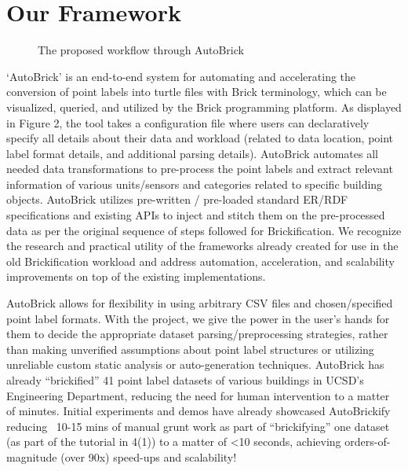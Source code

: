 \documentclass[twocolumn, switch]{article} %
\begin{document}
\section{Our Framework}

\begin{figure}[H]
  \centering
  \caption{The proposed workflow through AutoBrick}
  \label{fig:fig2}
\end{figure}

‘AutoBrick’ is an end-to-end system for automating and accelerating the conversion of point labels into turtle files with Brick terminology, which can be visualized, queried, and utilized by the Brick programming platform. As displayed in Figure 2, the tool takes a configuration file where users can declaratively specify all details about their data and workload (related to data location, point label format details, and additional parsing details). AutoBrick automates all needed data transformations to pre-process the point labels and extract relevant information of various units/sensors and categories related to specific building objects. AutoBrick utilizes pre-written / pre-loaded standard ER/RDF specifications and existing APIs to inject and stitch them on the pre-processed data as per the original sequence of steps followed for Brickification. We recognize the research and practical utility of the frameworks already created for use in the old Brickification workload and address automation, acceleration, and scalability improvements on top of the existing implementations. 

	AutoBrick allows for flexibility in using arbitrary CSV files and chosen/specified point label formats. With the project, we give the power in the user’s hands for them to decide the appropriate dataset parsing/preprocessing strategies, rather than making unverified assumptions about point label structures or utilizing unreliable custom static analysis or auto-generation techniques. AutoBrick has already “brickified” 41 point label datasets of various buildings in UCSD’s Engineering Department, reducing the need for human intervention to a matter of minutes. Initial experiments and demos have already showcased AutoBrickify reducing ~10-15 mins of manual grunt work as part of “brickifying” one dataset (as part of the tutorial in 4(1)) to a matter of <10 seconds, achieving orders-of-magnitude (over 90x) speed-ups and scalability!
\end{document}
